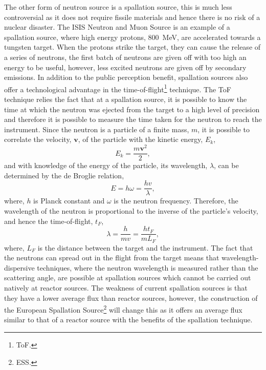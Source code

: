 The other form of neutron source is a spallation source, this is much less controversial as it does not require fissile materials and hence there is no risk of a nuclear disaster.
The ISIS Neutron and Muon Source is an example of a spallation source, where high energy protons, \SI{800}{\mega\eV},\autocite{noauthor_isis_nodate-1} are accelerated towards a tungsten target.
When the protons strike the target, they can cause the release of a series of neutrons, the first batch of neutrons are given off with too high an energy to be useful, however, less excited neutrons are given off by secondary emissions.
In addition to the public perception benefit, spallation sources also offer a technological advantage in the time-of-flight\footnote{ToF.} technique.
The ToF technique relies the fact that at a spallation source, it is possible to know the time at which the neutron was ejected from the target to a high level of precision and therefore it is possible to measure the time taken for the neutron to reach the instrument.
Since the neutron is a particle of a finite mass, $m$, it is possible to correlate the velocity, $\mathbf{v}$, of the particle with the kinetic energy, $E_k$,
%
\begin{equation}
    E_k = \frac{m\mathbf{v}^2}{2},
\end{equation}
%
and with knowledge of the energy of the particle, its wavelength, $\lambda$, can be determined by the de Broglie relation,\autocite{de_broglie_recherches_1925}
%
\begin{equation}
    E = h\omega = \frac{hv}{\lambda},
\end{equation}
%
where, $h$ is Planck constant and $\omega$ is the neutron frequency.
Therefore, the wavelength of the neutron is proportional to the inverse of the particle's velocity, and hence the time-of-flight, $t_F$,
%
\begin{equation}
    \lambda = \frac{h}{mv} = \frac{ht_F}{mL_F},
\end{equation}
%
where, $L_F$ is the distance between the target and the instrument.
The fact that the neutrons can spread out in the flight from the target means that wavelength-dispersive techniques, where the neutron wavelength is measured rather than the scattering angle, are possible at spallation sources which cannot be carried out natively at reactor sources.
The weakness of current spallation sources is that they have a lower average flux than reactor sources, however, the construction of the European Spallation Source\footnote{ESS.} will change this as it offers an average flux similar to that of a reactor source with the benefits of the spallation technique.

